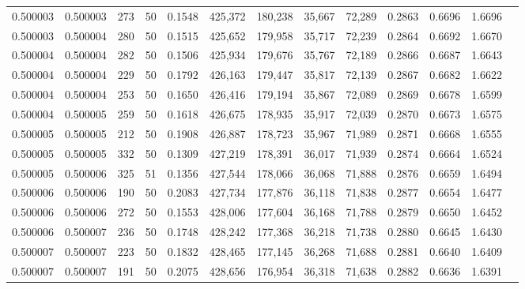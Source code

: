 \begin{tabular}{rrrrrrrrrrrrr}
0.500003 & 0.500003 &   273 &  50 &                                     0.1548 & 425,372 & 180,238 &  35,667 &  72,289 & 0.2863 & 0.6696 & 1.6696 \\
0.500003 & 0.500004 &   280 &  50 &                                     0.1515 & 425,652 & 179,958 &  35,717 &  72,239 & 0.2864 & 0.6692 & 1.6670 \\
0.500004 & 0.500004 &   282 &  50 &                                     0.1506 & 425,934 & 179,676 &  35,767 &  72,189 & 0.2866 & 0.6687 & 1.6643 \\
0.500004 & 0.500004 &   229 &  50 &                                     0.1792 & 426,163 & 179,447 &  35,817 &  72,139 & 0.2867 & 0.6682 & 1.6622 \\
0.500004 & 0.500004 &   253 &  50 &                                     0.1650 & 426,416 & 179,194 &  35,867 &  72,089 & 0.2869 & 0.6678 & 1.6599 \\
0.500004 & 0.500005 &   259 &  50 &                                     0.1618 & 426,675 & 178,935 &  35,917 &  72,039 & 0.2870 & 0.6673 & 1.6575 \\
0.500005 & 0.500005 &   212 &  50 &                                     0.1908 & 426,887 & 178,723 &  35,967 &  71,989 & 0.2871 & 0.6668 & 1.6555 \\
0.500005 & 0.500005 &   332 &  50 &                                     0.1309 & 427,219 & 178,391 &  36,017 &  71,939 & 0.2874 & 0.6664 & 1.6524 \\
0.500005 & 0.500006 &   325 &  51 &                                     0.1356 & 427,544 & 178,066 &  36,068 &  71,888 & 0.2876 & 0.6659 & 1.6494 \\
0.500006 & 0.500006 &   190 &  50 &                                     0.2083 & 427,734 & 177,876 &  36,118 &  71,838 & 0.2877 & 0.6654 & 1.6477 \\
0.500006 & 0.500006 &   272 &  50 &                                     0.1553 & 428,006 & 177,604 &  36,168 &  71,788 & 0.2879 & 0.6650 & 1.6452 \\
0.500006 & 0.500007 &   236 &  50 &                                     0.1748 & 428,242 & 177,368 &  36,218 &  71,738 & 0.2880 & 0.6645 & 1.6430 \\
0.500007 & 0.500007 &   223 &  50 &                                     0.1832 & 428,465 & 177,145 &  36,268 &  71,688 & 0.2881 & 0.6640 & 1.6409 \\
0.500007 & 0.500007 &   191 &  50 &                                     0.2075 & 428,656 & 176,954 &  36,318 &  71,638 & 0.2882 & 0.6636 & 1.6391 \\

\end{tabular}
